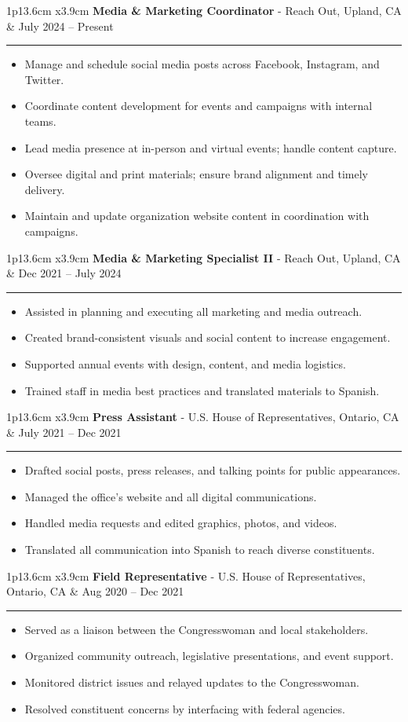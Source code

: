 \documentclass[10pt,a4paper,]{article}
\newcommand{\cvevent}[4]
{

\begin{tabular*}{1\textwidth}{p{13.6cm}  x{3.9cm}}
	\textbf{#2} - \textcolor{bgcol}{#3} &   \vspace{2.5pt}\textcolor{sectcol}{#1}
\end{tabular*}

\vspace{-2pt}
\textcolor{softcol}{\hrule}
\vspace{6pt}
#4
\vspace{1em}
}
\begin{document}
\cvevent{July 2024 – Present}{Media \& Marketing Coordinator}{Reach Out, Upland, CA\empty}{\begin{minipage}{0.7\textwidth}%
\begin{itemize}%
\item Manage and schedule social media posts across Facebook, Instagram, and Twitter.%
\item Coordinate content development for events and campaigns with internal teams.%
\item Lead media presence at in-person and virtual events; handle content capture.%
\item Oversee digital and print materials; ensure brand alignment and timely delivery.%
\item Maintain and update organization website content in coordination with campaigns.%
\end{itemize}%
\end{minipage}}
\cvevent{Dec 2021 – July 2024}{Media \& Marketing Specialist II}{Reach Out, Upland, CA\empty}{\begin{minipage}{0.7\textwidth}%
\begin{itemize}%
\item Assisted in planning and executing all marketing and media outreach.%
\item Created brand-consistent visuals and social content to increase engagement.%
\item Supported annual events with design, content, and media logistics.%
\item Trained staff in media best practices and translated materials to Spanish.%
\end{itemize}%
\end{minipage}}
\cvevent{July 2021 – Dec 2021}{Press Assistant}{U.S. House of Representatives, Ontario, CA\empty}{\begin{minipage}{0.7\textwidth}%
\begin{itemize}%
\item Drafted social posts, press releases, and talking points for public appearances.%
\item Managed the office’s website and all digital communications.%
\item Handled media requests and edited graphics, photos, and videos.%
\item Translated all communication into Spanish to reach diverse constituents.%
\end{itemize}%
\end{minipage}}
\cvevent{Aug 2020 – Dec 2021}{Field Representative}{U.S. House of Representatives, Ontario, CA\empty}{\begin{minipage}{0.7\textwidth}%
\begin{itemize}%
\item Served as a liaison between the Congresswoman and local stakeholders.%
\item Organized community outreach, legislative presentations, and event support.%
\item Monitored district issues and relayed updates to the Congresswoman.%
\item Resolved constituent concerns by interfacing with federal agencies.%
\end{itemize}%
\end{minipage}}
\end{document}
